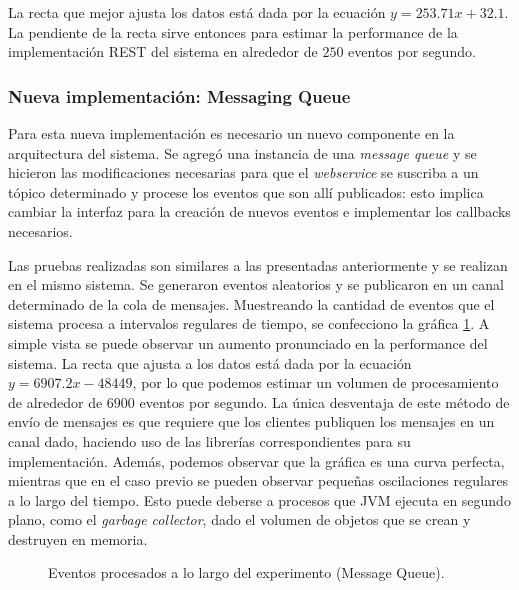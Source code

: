\documentclass[a4paper,10pt, oneside]{article}
\begin{document}
La recta que mejor ajusta los datos está dada por la ecuación $y = 253.71 x + 32.1$. La pendiente de la recta sirve entonces para estimar la performance de la implementación REST del sistema en alrededor de $250$ eventos por segundo.

\subsubsection{Nueva implementación: Messaging Queue}
Para esta nueva implementación es necesario un nuevo componente en la arquitectura del sistema. Se agregó una instancia de una \textit{message queue} y se hicieron las modificaciones necesarias para que el \textit{webservice} se suscriba a un tópico determinado y procese los eventos que son allí publicados: esto implica cambiar la interfaz para la creación de nuevos eventos e implementar los callbacks necesarios.

Las pruebas realizadas son similares a las presentadas anteriormente y se realizan en el mismo sistema. Se generaron eventos aleatorios y se publicaron en un canal determinado de la cola de mensajes. Muestreando la cantidad de eventos que el sistema procesa a intervalos regulares de tiempo, se confecciono la gráfica \ref{fig:MQ}. A simple vista se puede observar un aumento pronunciado en la performance del sistema. La recta que ajusta a los datos está dada por la ecuación $y = 6907.2 x - 48449$, por lo que podemos estimar un volumen de procesamiento de alrededor de $6900$ eventos por segundo. La única desventaja de este método de envío de mensajes es que requiere que los clientes publiquen los mensajes en un canal dado, haciendo uso de las librerías correspondientes para su implementación. Además, podemos observar que la gráfica es una curva perfecta, mientras que en el caso previo se pueden observar pequeñas oscilaciones regulares a lo largo del tiempo. Esto puede deberse a procesos que JVM ejecuta en segundo plano, como el \textit{garbage collector}, dado el volumen de objetos que se crean y destruyen en memoria.
\begin{figure}[htpb]
	\centering
	
	\caption{Eventos procesados a lo largo del experimento (Message Queue).} \label{fig:MQ}
\end{figure}
\end{document}
